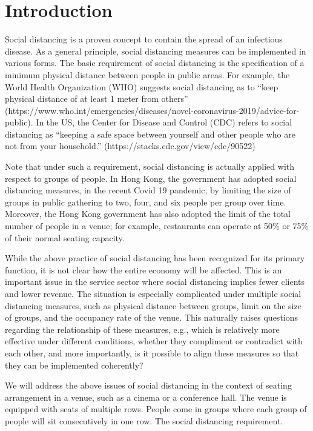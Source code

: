 \section{Introduction}
Social distancing is a proven concept to contain the spread of an infectious disease. As a general principle, social distancing measures can be implemented in various forms. The basic requirement of social distancing is the specification of a minimum physical distance between people in public areas. For example, the World Health Organization (WHO) suggests social distancing as to ``keep physical distance of at least 1 meter from others'' (https://www.who.int/emergencies/diseases/novel-coronavirus-2019/advice-for-public). In the US, the Center for Disease and Control (CDC) refers to social distancing as ``keeping a safe space between yourself and other people who are not from your household.'' (https://stacks.cdc.gov/view/cdc/90522)

Note that under such a requirement, social distancing is actually applied with respect to groups of people. In Hong Kong, the government has adopted social distancing measures, in the recent Covid 19 pandemic, by limiting the size of groups in public gathering to two, four, and six people per group over time. Moreover, the Hong Kong government has also adopted the limit of the total number of people in a venue; for example, restaurants can operate at 50\% or 75\% of their normal seating capacity.


While the above practice of social distancing has been recognized for its primary function,  it is not clear how the entire economy will be affected. This is an important issue in the service sector where social distancing implies fewer clients and lower revenue. The situation is especially complicated under multiple social distancing measures, such as physical distance between groups, limit on the size of groups, and the occupancy rate of the venue. This naturally raises questions regarding the relationship of these measures, e.g., which is relatively more effective under different conditions, whether they compliment or contradict with each other, and more importantly, is it possible to align these measures so that they can be implemented coherently? 

We will address the above issues of social distancing in the context of seating arrangement in a venue, such as a cinema or a conference hall. The venue is equipped with seats of multiple rows.  People come in groups where each group of people will sit consecutively in one row. The social distancing requirement.


